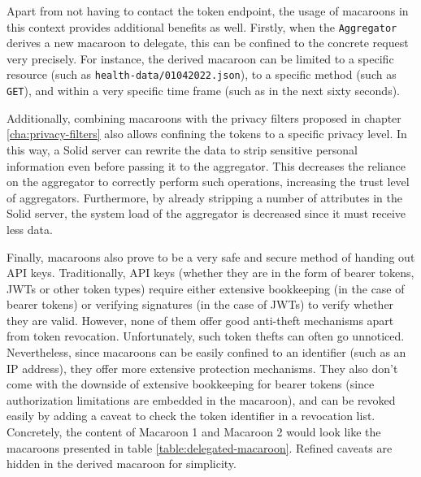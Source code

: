 Apart from not having to contact the token endpoint, the usage of macaroons in this context provides additional benefits as well. 
Firstly, when the \texttt{Aggregator} derives a new macaroon to delegate, this can be confined to the concrete request very precisely. For instance, the derived macaroon can be limited to a specific resource (such as \texttt{health-data/01042022.json}), to a specific method (such as \texttt{GET}), and within a very specific time frame (such as in the next sixty seconds). 

Additionally, combining macaroons with the privacy filters proposed in chapter \ref{cha:privacy-filters} also allows confining the tokens to a specific privacy level. In this way, a Solid server can rewrite the data to strip sensitive personal information even before passing it to the aggregator. This decreases the reliance on the aggregator to correctly perform such operations, increasing the trust level of aggregators. Furthermore, by already stripping a number of attributes in the Solid server, the system load of the aggregator is decreased since it must receive less data.

Finally, macaroons also prove to be a very safe and secure method of handing out API keys. Traditionally, API keys (whether they are in the form of bearer tokens, \gls{JWT}s or other token types) require either extensive bookkeeping (in the case of bearer tokens) or verifying signatures (in the case of \gls{JWT}s) to verify whether they are valid. However, none of them offer good anti-theft mechanisms apart from token revocation. Unfortunately, such token thefts can often go unnoticed. Nevertheless, since macaroons can be easily confined to an identifier (such as an IP address), they offer more extensive protection mechanisms. They also don't come with the downside of extensive bookkeeping for bearer tokens (since authorization limitations are embedded in the macaroon), and can be revoked easily by adding a caveat to check the token identifier in a revocation list. Concretely, the content of Macaroon 1 and Macaroon 2 would look like the macaroons presented in table \ref{table:delegated-macaroon}. Refined caveats are hidden in the derived macaroon for simplicity.

